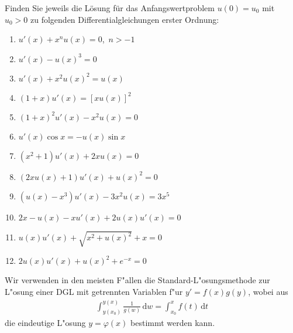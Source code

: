 \documentclass[11pt,answers]{exam}
\begin{document}
\begin{questions}


% 


Finden Sie jeweils die Lösung für das Anfangswertproblem $u(0)=u_0$
mit $u_0>0$ zu folgenden Differentialgleichungen erster Ordnung:\\
\parbox{0.5\textwidth}{\begin{enumerate}
\item $u'(x)+x^nu(x)=0$,~$n>-1$%
\item $u'(x)-u(x)^3=0$%
\item $u'(x)+x^2u(x)^2=u(x)$%
\item $(1+x)u'(x)=[xu(x)]^2$%
\item $(1+x)^2u'(x)-x^2u(x)=0$%
\item $u'(x)\cos x=-u(x)\sin x$%
\end{enumerate}}\parbox{0.5\textwidth}{\begin{enumerate}\setcounter{enumi}{6}
\item $\left(x^2+1\right) u'(x)+2 x u(x)=0$%
\item $(2 x u(x)+1) u'(x)+u(x)^2=0$%
\item $(u(x)- x^3)u'(x)-3 x^2 u(x) = 3 x^5 $%
\item $2 x - u(x) - x u'(x) + 2 u(x)u'(x)=0$%
\item $u(x)u'(x)+\sqrt{x^2+u(x)^2}+x=0$%
\item $2 u(x) u'(x)+u(x)^2+e^{-x} = 0$%
\end{enumerate}}
\begin{solution}Wir verwenden in den meisten F"allen die Standard-L"osungsmethode zur L"osung einer DGL mit getrennten Variablen f"ur $y'=f(x)g(y)$, wobei aus
\begin{align*}
\int_{y(x_0)}^{y(x)}\frac{1}{g(w)}\,\mathrm dw=\int_{x_0}^xf(t)\,\mathrm dt
\end{align*}
die eindeutige L"osung $y=\varphi(x)$ bestimmt werden kann.


\end{solution}
\end{questions}
\end{document}
